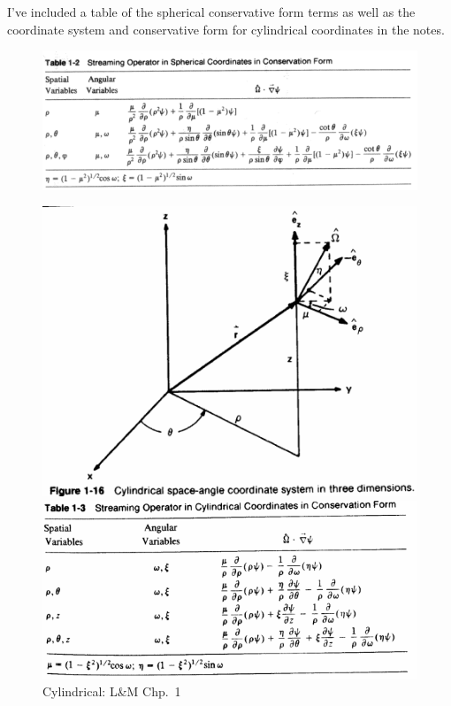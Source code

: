 \documentclass[12pt]{article}
\begin{document}
I've included a table of the spherical conservative form terms as well as the coordinate system and conservative form for cylindrical coordinates in the notes.
%
\begin{figure}[h!] 
    \label{fig:sph-op}
    \begin{center}
    \includegraphics[keepaspectratio, width = 6 in]{../figs/spherical-operator}
    \end{center}    
\end{figure}

\begin{figure}[h!]
    \begin{center}
    \includegraphics[keepaspectratio, width = 4 in]{../figs/cyl-coords}
    \end{center}    
    \label{fig:cyl-coord}
    \begin{center}
    \includegraphics[keepaspectratio, width = 5 in]{../figs/cyl-operator}
    \end{center}    
    \caption{Cylindrical: L\&M Chp.\ 1}
\end{figure}
\end{document}
